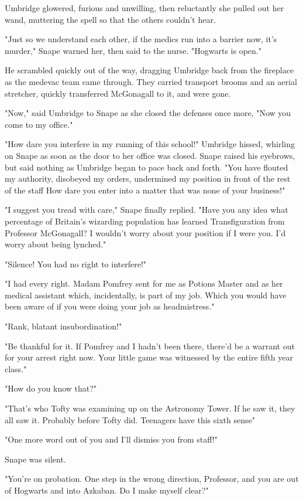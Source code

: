Umbridge glowered, furious and unwilling, then reluctantly she pulled out her wand, muttering the spell so that the others couldn't hear.

"Just so we understand each other, if the medics run into a barrier now, it's murder," Snape warned her, then said to the nurse. "Hogwarts is open."

He scrambled quickly out of the way, dragging Umbridge back from the fireplace as the medevac team came through. They carried transport brooms and an aerial stretcher, quickly transferred McGonagall to it, and were gone.

"Now," said Umbridge to Snape as she closed the defenses once more, "Now you come to my office."

"How dare you interfere in my running of this school!" Umbridge hissed, whirling on Snape as soon as the door to her office was closed. Snape raised his eyebrows, but said nothing as Umbridge began to pace back and forth. "You have flouted my authority, disobeyed my orders, undermined my position in front of the rest of the staff{\el} How dare you enter into a matter that was none of your business!"

"I suggest you tread with care," Snape finally replied. "Have you any idea what percentage of Britain's wizarding population has learned Transfiguration from Professor McGonagall? I wouldn't worry about your position if I were you. I'd worry about being lynched."

"Silence! You had no right to interfere!"

"I had every right. Madam Pomfrey sent for me as Potions Master and as her medical assistant which, incidentally, is part of my job. Which you would have been aware of if you were doing your job as headmistress."

"Rank, blatant insubordination!"

"Be thankful for it. If Pomfrey and I hadn't been there, there'd be a warrant out for your arrest right now. Your little game was witnessed by the entire fifth year class."

"How do you know that?"

"That's who Tofty was examining up on the Astronomy Tower. If he saw it, they all saw it. Probably before Tofty did. Teenagers have this sixth sense{\el}"

"One more word out of you and I'll dismiss you from staff!"

Snape was silent.

"You're on probation. One step in the wrong direction, Professor, and you are out of Hogwarts and into Azkaban. Do I make myself clear?"

